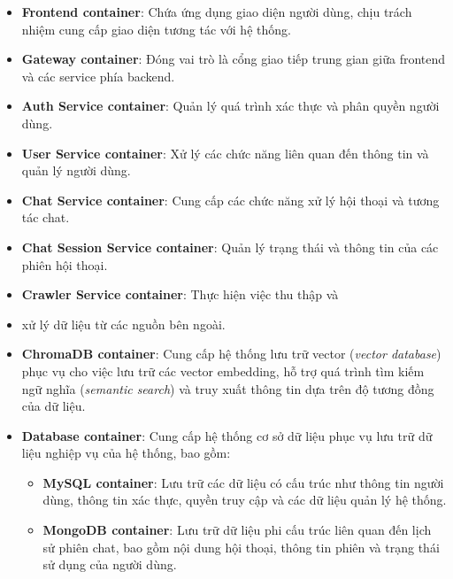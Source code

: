 \documentclass[../DoAn.tex]{subfiles}
\begin{document}
\begin{itemize}
    \item \textbf{Frontend container}: Chứa ứng dụng giao diện người dùng,
          chịu trách nhiệm cung cấp giao diện tương tác với hệ thống.

    \item \textbf{Gateway container}: Đóng vai trò là cổng giao tiếp trung gian
          giữa frontend và các service phía backend.

    \item \textbf{Auth Service container}: Quản lý quá trình xác thực và
          phân quyền người dùng.

    \item \textbf{User Service container}: Xử lý các chức năng liên quan đến
          thông tin và quản lý người dùng.

    \item \textbf{Chat Service container}: Cung cấp các chức năng xử lý
          hội thoại và tương tác chat.

    \item \textbf{Chat Session Service container}: Quản lý trạng thái và
          thông tin của các phiên hội thoại.

    \item \textbf{Crawler Service container}: Thực hiện việc thu thập và
    \item
          xử lý dữ liệu từ các nguồn bên ngoài.
    \item \textbf{ChromaDB container}:
          Cung cấp hệ thống lưu trữ vector (\textit{vector database}) phục vụ cho việc
          lưu trữ các vector embedding, hỗ trợ quá trình tìm kiếm ngữ nghĩa
          (\textit{semantic search}) và truy xuất thông tin dựa trên độ tương đồng của
          dữ liệu.

    \item \textbf{Database container}:
          Cung cấp hệ thống cơ sở dữ liệu phục vụ lưu trữ dữ liệu nghiệp vụ của hệ thống,
          bao gồm:
          \begin{itemize}
              \item \textbf{MySQL container}: Lưu trữ các dữ liệu có cấu trúc như thông
                    tin người dùng, thông tin xác thực, quyền truy cập và các dữ liệu quản lý
                    hệ thống.

              \item \textbf{MongoDB container}: Lưu trữ dữ liệu phi cấu trúc liên quan
                    đến lịch sử phiên chat, bao gồm nội dung hội thoại, thông tin phiên và
                    trạng thái sử dụng của người dùng.
          \end{itemize}
\end{itemize}
\end{document}
